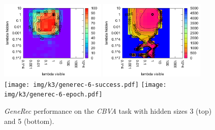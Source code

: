 \begin{figure}[H]
  \centering
  \includegraphics[width=0.45\textwidth]{img/k3/generec-3-success.pdf} 
  \includegraphics[width=0.45\textwidth]{img/k3/generec-3-epoch.pdf}   
  \texttt{[image: img/k3/generec-6-success.pdf]} 
  \texttt{[image: img/k3/generec-6-epoch.pdf]}  
  \caption{\emph{GeneRec} performance on the \emph{CBVA} task with hidden sizes 3 (top) and 5 (bottom).} %
  \label{fig:results-generec-k3-success}
\end{figure}


